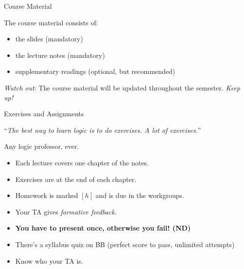 \begin{frame}{Course Material}

	The course material consists of:

	\begin{itemize}[<+->]

		\item the slides (mandatory)

		\item the lecture notes (mandatory)

		\item supplementary readings (optional, but recommended)

	\end{itemize}

	\emph{Watch out}: The course material will be updated throughout the semester. \emph{Keep up!}

\end{frame}
\begin{frame}{Exercises and Assignments}

``{\it The best way to learn logic is to do exercises. A lot of exercises.}''
\begin{flushright}
Any logic professor, ever.
\end{flushright}

	\begin{itemize}[<+->]

		\item Each lecture covers one chapter of the notes.

		\item Exercises are at the end of each chapter.

		\item Homework is marked $[h]$ and is due in the workgroups.

		\item Your TA gives \emph{formative feedback}.

		\item \textbf{You have to present once, otherwise you fail! (ND)}

		\item There's a syllabus quiz on BB (perfect score to pass, unlimited attempts)

		\item Know who your TA is.

	\end{itemize}

\end{frame}

